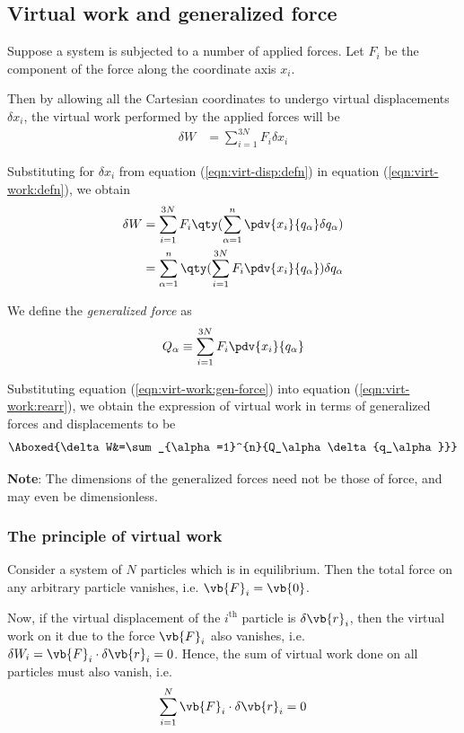 \subsection{Virtual work and generalized force}
Suppose a system is subjected to a number of applied forces. Let $F_i$ be the component of the force along the coordinate axis $x_i$.

Then by allowing all the Cartesian coordinates to undergo virtual displacements $\delta x_i$, the virtual work performed by the applied forces will be
\begin{align}
	\delta W&=\sum_{i=1}^{3N}{F_i\delta x_i} \label{eqn:virt-work:defn}
\end{align}

Substituting for $\delta x_i$ from equation (\ref{eqn:virt-disp:defn}) in equation (\ref{eqn:virt-work:defn}), we obtain
\begin{align}
	\delta W&=\sum_{i=1}^{3N}{F_i \qty(\sum_{\alpha=1}^{n}{\pdv{x_i}{q_\alpha}\delta{q_\alpha}})} \nonumber\\
	&=\sum_{\alpha=1}^{n}{\qty(\sum_{i=1}^{3N}{F_i\pdv{x_i}{q_\alpha}})\delta{q_\alpha}} \label{eqn:virt-work:rearr}
\end{align}

We define the \textit{generalized force} as
\begin{align}
	Q_\alpha\equiv\sum_{i=1}^{3N}{F_i\pdv{x_i}{q_\alpha}} \label{eqn:virt-work:gen-force}
\end{align}

Substituting equation (\ref{eqn:virt-work:gen-force}) into equation (\ref{eqn:virt-work:rearr}), we obtain the expression of virtual work in terms of generalized forces and displacements to be
\begin{align}
	\Aboxed{\delta W&=\sum_{\alpha=1}^{n}{Q_\alpha\delta{q_\alpha}}} \label{eqn:virt-work:gen-force-displ}
\end{align}

\textbf{Note}: The dimensions of the generalized forces need not be those of force, and may even be dimensionless.

\setcounter{equation}{0}
\subsubsection{The principle of virtual work}
Consider a system of $N$ particles which is in equilibrium. Then the total force on any arbitrary particle vanishes, i.e. $\vb{F}_i=\vb{0}$.

Now, if the virtual displacement of the $i^\text{th}$ particle is $\delta{\vb{r}_i}$, then the virtual work on it due to the force $\vb{F}_i$ also vanishes, i.e. $\delta{W}_i=\vb{F}_i\cdot\delta{\vb{r}_i}=0$. Hence, the sum of virtual work done on all particles must also vanish, i.e.
\begin{align}
	\sum_{i=1}^{N}{\vb{F}_i\cdot\delta{\vb{r}_i}}=0 \label{eqn:virt-work-system}
\end{align}

